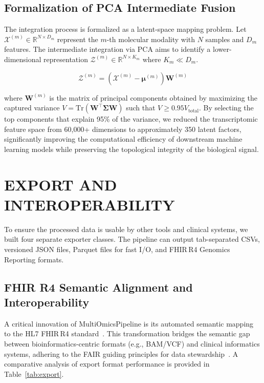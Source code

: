 \documentclass[twocolumn]{article}
\begin{document}
\subsection{Formalization of PCA Intermediate Fusion}
The integration process is formalized as a latent-space mapping problem. Let $\mathcal{X}^{(m)} \in \mathbb{R}^{N \times D_m}$ represent the $m$-th molecular modality with $N$ samples and $D_m$ features. The intermediate integration via PCA aims to identify a lower-dimensional representation $\mathcal{Z}^{(m)} \in \mathbb{R}^{N \times K_m}$ where $K_m \ll D_m$.

\begin{equation}
\mathcal{Z}^{(m)} = (\mathcal{X}^{(m)} - \mathbf{\mu}^{(m)}) \mathbf{W}^{(m)}
\end{equation}

where $\mathbf{W}^{(m)}$ is the matrix of principal components obtained by maximizing the captured variance $V = \text{Tr}(\mathbf{W}^\top \mathbf{\Sigma} \mathbf{W})$ such that $V \geq 0.95 V_{\text{total}}$. By selecting the top components that explain 95\% of the variance, we reduced the transcriptomic feature space from 60,000+ dimensions to approximately 350 latent factors, significantly improving the computational efficiency of downstream machine learning models while preserving the topological integrity of the biological signal.

\section{\uppercase{Export and Interoperability}}

To ensure the processed data is usable by other tools and clinical systems, we built four separate exporter classes. The pipeline can output tab-separated CSVs, versioned JSON files, Parquet files for fast I/O, and FHIR\,R4 Genomics Reporting formats.

\subsection{FHIR R4 Semantic Alignment and Interoperability}
A critical innovation of MultiOmicsPipeline is its automated semantic mapping to the HL7 FHIR\,R4 standard~\cite{hl7fhir}. This transformation bridges the semantic gap between bioinformatics-centric formats (e.g., BAM/VCF) and clinical informatics systems, adhering to the FAIR guiding principles for data stewardship~\cite{wilkinson2016}. A comparative analysis of export format performance is provided in Table~\ref{tab:export}.
\end{document}
